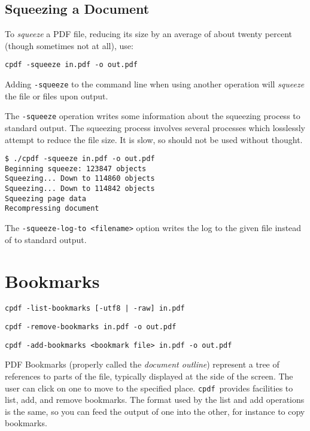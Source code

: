 \documentclass{book}
\newcommand{\cpdf}{\texttt{cpdf}}
\begin{document}
  \section{Squeezing a Document}
  To \textit{squeeze} a PDF file, reducing its size by an average of about twenty percent (though sometimes not at all), use:
  \begin{framed}
    \small\verb!cpdf -squeeze in.pdf -o out.pdf!
  \end{framed}
  \noindent Adding \texttt{-squeeze} to the command line when using another operation will \textit{squeeze} the file or files upon output.
  
  The \texttt{-squeeze} operation writes some information about the squeezing process to standard output. The squeezing process involves several processes which losslessly attempt to reduce the file size. It is slow, so should not be used without thought.

\begin{verbatim}
$ ./cpdf -squeeze in.pdf -o out.pdf
Beginning squeeze: 123847 objects
Squeezing... Down to 114860 objects
Squeezing... Down to 114842 objects
Squeezing page data
Recompressing document
\end{verbatim}

The \texttt{-squeeze-log-to <filename>} option writes the log to the given file instead of to standard output.

\chapter{Bookmarks}
  \begin{framed}
  \small\noindent\verb!cpdf -list-bookmarks [-utf8 | -raw] in.pdf!

  \vspace{1.5mm}
  \small\noindent\verb!cpdf -remove-bookmarks in.pdf -o out.pdf!

  \vspace{1.5mm}
  \small\noindent\verb!cpdf -add-bookmarks <bookmark file> in.pdf -o out.pdf!

  \end{framed}
  PDF Bookmarks (properly called the \textit{document outline}) represent a tree
of references to parts of the file, typically displayed at the side of the
screen. The user can click on one to move to the specified place. \cpdf\ provides
facilities to list, add, and remove bookmarks. The format used by the list and
add operations is the same, so you can feed the output of one into the other,
for instance to copy bookmarks.
\end{document}
